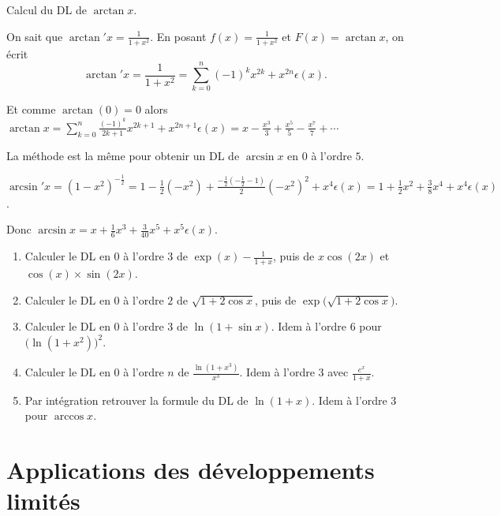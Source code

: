 \documentclass[class=report,crop=false]{standalone}
\begin{document}
\begin{exemple}
Calcul du DL de $\arctan x$.


On sait que $\arctan' x=\frac{1}{1+x^2}$. En posant $f(x)=\frac{1}{1+x^2}$
et $F(x)=\arctan x$,  on écrit
$$\arctan' x=\frac{1}{1+x^2}=\sum_{k=0}^{n}(-1)^kx^{2k}+x^{2n}\epsilon(x).$$

Et comme $\arctan(0)=0$ alors
$\arctan x=\sum_{k=0}^{n}\frac{(-1)^k}{2k+1}x^{2k+1}+x^{2n+1}\epsilon(x)
=x-\frac{x^3}{3}+\frac{x^5}{5}-\frac{x^7}{7} +\cdots$
\end{exemple}

\begin{exemple}
La méthode est la même pour obtenir un DL de $\arcsin x$ en $0$ à l'ordre $5$.

$\arcsin' x=(1-x^2)^{-\frac{1}{2}}
=1-\frac{1}{2}(-x^2)
+\frac{-\frac{1}{2}(-\frac{1}{2}-1)}{2}(-x^2)^2+x^4\epsilon(x)
=1+\frac{1}{2}x^2 + \frac{3}{8}x^4+x^4\epsilon(x)$.

Donc $\arcsin x =x+\frac{1}{6}x^3+\frac{3}{40}x^5+x^5\epsilon(x)$.
\end{exemple}



\begin{miniexercices}
\sauteligne
\begin{enumerate}
  \item Calculer le DL en $0$ à l'ordre $3$ de $\exp(x) -\frac{1}{1+x}$, puis de $x\cos(2x)$ et $\cos(x)\times \sin(2x)$.
  \item Calculer le DL en $0$ à l'ordre $2$ de $\sqrt{1+2\cos x}$, puis de $\exp\big(\sqrt{1+2\cos x}\big)$.
  \item Calculer le DL en $0$ à l'ordre $3$ de $\ln(1+\sin x)$. Idem à l'ordre $6$ pour $\big(\ln(1+x^2)\big)^2$.
  \item Calculer le DL en $0$ à l'ordre $n$ de $\frac{\ln(1+x^3)}{x^3}$. Idem à l'ordre $3$ avec $\frac{e^x}{1+x}$.
  \item Par intégration retrouver la formule du DL de $\ln(1+x)$. Idem à l'ordre $3$ pour $\arccos x$.
\end{enumerate}
\end{miniexercices}


\section{Applications des développements limités}
\end{document}

